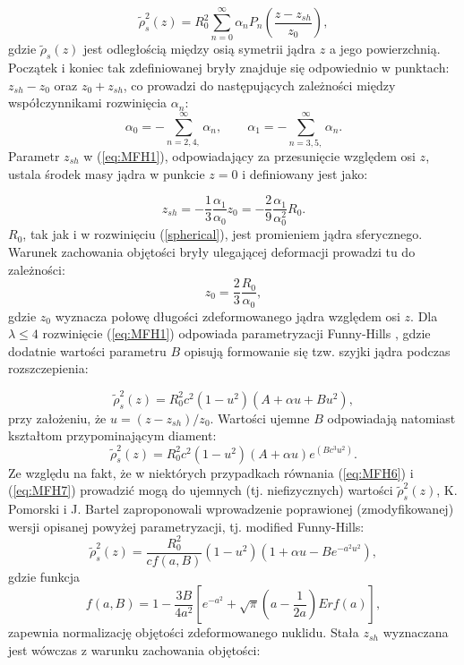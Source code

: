 \documentclass[a4paper,polish]{article}
\numberwithin{equation}{section}
\begin{document}
\begin{equation} \label{eq:MFH1}
\tilde{\rho}^{2}_{s}(z)=R_{0}^{2}\sum_{n=0}^{\infty}\alpha_{n}P_{n}\left(\frac{z-z_{sh}}{z_{0}}\right),
\end{equation}
gdzie $\tilde{\rho}_{s}(z)$ jest odległością między osią symetrii jądra $z$ a jego powierzchnią. Początek i koniec tak zdefiniowanej bryły znajduje się odpowiednio w punktach: $z_{sh}-z_{0}$ oraz $z_{0}+z_{sh}$, co prowadzi do następujących zależności między współczynnikami rozwinięcia $\alpha_{n}$:
\begin{equation} \label{eq:MFH2}
\alpha_{0}=-\sum_{n=2,4,}^{\infty}\alpha_{n}, \qquad \alpha_{1}=-\sum_{n=3,5,}^{\infty}\alpha_{n}.
\end{equation}
Parametr $z_{sh}$ w (\ref{eq:MFH1}), odpowiadający za przesunięcie względem osi $z$, ustala środek masy jądra w punkcie $z=0$ i definiowany jest jako:

\begin{equation} \label{eq:MFH3}
z_{sh}=-\frac{1}{3}\frac{\alpha_{1}}{\alpha_{0}}z_{0}=-\frac{2}{9}\frac{\alpha_{1}}{\alpha_{0}^{2}}R_{0}.
\end{equation}
$R_{0}$, tak jak i w rozwinięciu (\ref{spherical}), jest promieniem jądra sferycznego. Warunek zachowania objętości bryły ulegającej deformacji prowadzi tu do zależności:
\begin{equation} \label{eq:MFH4}
z_{0}=\frac{2}{3}\frac{R_{0}}{\alpha_{0}},
\end{equation}
gdzie $z_{0}$ wyznacza połowę długości zdeformowanego jądra względem osi $z$. Dla $\lambda\leq4$ rozwinięcie (\ref{eq:MFH1}) odpowiada parametryzacji Funny-Hills \cite{OLDMFH}, gdzie dodatnie wartości parametru $B$ opisują formowanie się tzw. szyjki jądra podczas rozszczepienia: 

\begin{equation} \label{eq:MFH6}
\tilde{\rho}^{2}_{s}(z)=R_{0}^{2}c^{2}(1-u^{2})(A+\alpha u+Bu^{2}),
\end{equation}
przy założeniu, że $u=(z-z_{sh}) /z_{0}$.
Wartości ujemne $B$ odpowiadają natomiast kształtom przypominającym diament:
\begin{equation} \label{eq:MFH7}
\tilde{\rho}^{2}_{s}(z)=R_{0}^{2}c^{2}(1-u^{2})(A+\alpha u)e^{(Bc^{3}u^{2})}.
\end{equation}
Ze względu na fakt, że w niektórych przypadkach równania (\ref{eq:MFH6}) i (\ref{eq:MFH7}) prowadzić mogą do ujemnych (tj. niefizycznych) wartości $\tilde{\rho}^{2}_{s}(z)$, K. Pomorski i J. Bartel zaproponowali wprowadzenie poprawionej (zmodyfikowanej) wersji opisanej powyżej parametryzacji, tj. modified Funny-Hills:
\begin{equation} \label{eq:MFH8}
\tilde{\rho}^{2}_{s}(z)=\frac{R_{0}^{2}}{c f(a,B)}(1-u^{2})(1+\alpha u-Be^{-a^{2}u^{2}}),
\end{equation}
gdzie funkcja
\begin{equation} \label{eq:MFH9}
f(a,B)=1-\frac{3B}{4a^{2}}\left[e^{-a^{2}}+\sqrt{\pi}(a-\frac{1}{2a})Erf(a)\right],
\end{equation}
zapewnia normalizację objętości zdeformowanego nuklidu. Stała $z_{sh}$ wyznaczana jest wówczas z warunku zachowania objętości:
\end{document}
